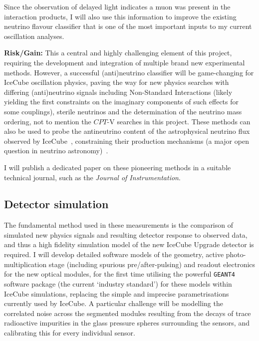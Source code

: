 \documentclass[a4paper,11pt]{article}
\begin{document}
Since the observation of delayed light indicates a muon was present in the interaction products, I will also use this information to improve the existing neutrino flavour classifier that is one of the most important inputs to my current oscillation analyses. 

\textbf{Risk/Gain:} This a central and highly challenging element of this project, requiring the development and integration of multiple brand new experimental methods. However, a successful (anti)neutrino classifier will be game-changing for IceCube oscillation physics, paving the way for new physics searches with differing (anti)neutrino signals including Non-Standard Interactions (likely yielding the first constraints on the imaginary components of such effects for some couplings), sterile neutrinos and the determination of the neutrino mass ordering, not to mention the $CPT$-V searches in this project. These methods can also be used to probe the antineutrino content of the astrophysical neutrino flux observed by IceCube~\cite{Aartsen:2013jdh}, constraining their production mechanisms (a major open question in neutrino astronomy)~\cite{glashow_icecube}.

I will publish a dedicated paper on these pioneering methods in a suitable technical journal, such as the \textit{Journal of Instrumentation}. \\


\subsection{Detector simulation}

The fundamental method used in these measurements is the comparison of simulated new physics signals and resulting detector response to observed data, and thus a high fidelity simulation model of the new IceCube Upgrade detector is required. I will develop detailed software models of the geometry, active photo-multiplication stage (including spurious pre/after-pulsing) and readout electronics for the new optical modules, for the first time utilising the powerful \texttt{GEANT4}~\cite{Agostinelli:2002hh} software package (the current `industry standard') for these models within IceCube simulations, replacing the simple and imprecise parametrisations currently used by IceCube. A particular challenge will be modelling the correlated noise across the segmented modules resulting from the decays of trace radioactive impurities in the glass pressure spheres surrounding the sensors, and calibrating this for every individual sensor. 
\end{document}
